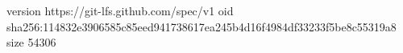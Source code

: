 version https://git-lfs.github.com/spec/v1
oid sha256:114832e3906585c85eed941738617ea245b4d16f4984df33233f5be8c55319a8
size 54306
